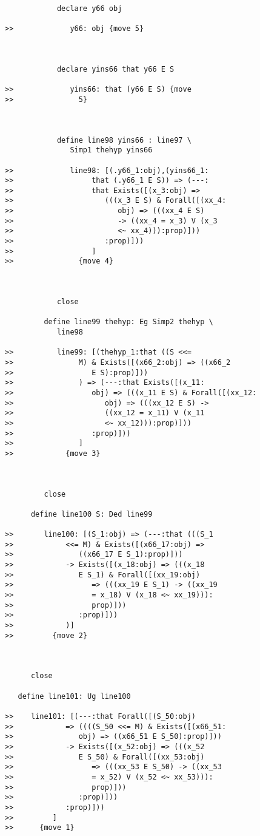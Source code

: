 \documentclass[12pt]{article}
\begin{document}
\begin{verbatim}
            declare y66 obj

>>             y66: obj {move 5}



            declare yins66 that y66 E S

>>             yins66: that (y66 E S) {move
>>               5}



            define line98 yins66 : line97 \
               Simp1 thehyp yins66

>>             line98: [(.y66_1:obj),(yins66_1:
>>                  that (.y66_1 E S)) => (---:
>>                  that Exists([(x_3:obj) =>
>>                     (((x_3 E S) & Forall([(xx_4:
>>                        obj) => (((xx_4 E S)
>>                        -> ((xx_4 = x_3) V (x_3
>>                        <~ xx_4))):prop)]))
>>                     :prop)]))
>>                  ]
>>               {move 4}



            close

         define line99 thehyp: Eg Simp2 thehyp \
            line98

>>          line99: [(thehyp_1:that ((S <<=
>>               M) & Exists([(x66_2:obj) => ((x66_2
>>                  E S):prop)]))
>>               ) => (---:that Exists([(x_11:
>>                  obj) => (((x_11 E S) & Forall([(xx_12:
>>                     obj) => (((xx_12 E S) ->
>>                     ((xx_12 = x_11) V (x_11
>>                     <~ xx_12))):prop)]))
>>                  :prop)]))
>>               ]
>>            {move 3}



         close

      define line100 S: Ded line99

>>       line100: [(S_1:obj) => (---:that (((S_1
>>            <<= M) & Exists([(x66_17:obj) =>
>>               ((x66_17 E S_1):prop)]))
>>            -> Exists([(x_18:obj) => (((x_18
>>               E S_1) & Forall([(xx_19:obj)
>>                  => (((xx_19 E S_1) -> ((xx_19
>>                  = x_18) V (x_18 <~ xx_19))):
>>                  prop)]))
>>               :prop)]))
>>            )]
>>         {move 2}



      close

   define line101: Ug line100

>>    line101: [(---:that Forall([(S_50:obj)
>>            => ((((S_50 <<= M) & Exists([(x66_51:
>>               obj) => ((x66_51 E S_50):prop)]))
>>            -> Exists([(x_52:obj) => (((x_52
>>               E S_50) & Forall([(xx_53:obj)
>>                  => (((xx_53 E S_50) -> ((xx_53
>>                  = x_52) V (x_52 <~ xx_53))):
>>                  prop)]))
>>               :prop)]))
>>            :prop)]))
>>         ]
>>      {move 1}




\end{verbatim}
\end{document}
